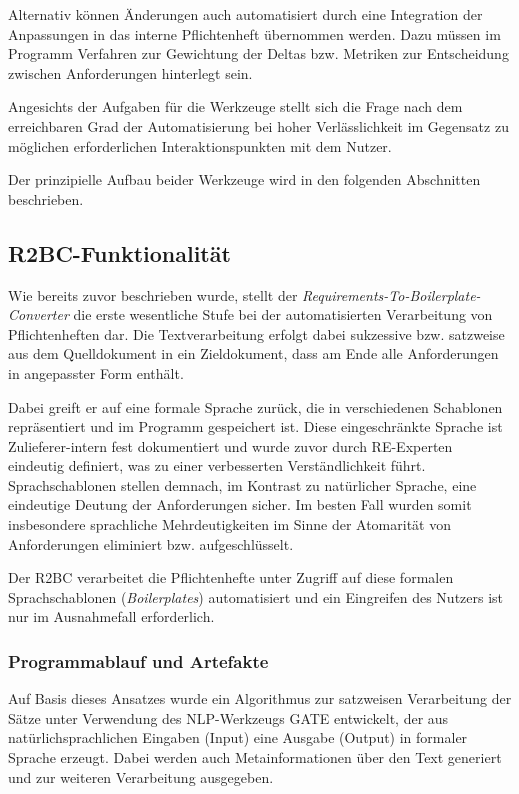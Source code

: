 \documentclass[12pt]{report}
\begin{document}
Alternativ können Änderungen auch automatisiert durch eine Integration der Anpassungen in das interne Pflichtenheft übernommen werden. Dazu müssen im Programm Verfahren zur Gewichtung der Deltas bzw. Metriken zur Entscheidung zwischen Anforderungen hinterlegt sein.

Angesichts der Aufgaben für die Werkzeuge stellt sich die Frage nach dem erreichbaren Grad der Automatisierung bei hoher Verlässlichkeit im Gegensatz zu möglichen erforderlichen Interaktionspunkten mit dem Nutzer. 

Der prinzipielle Aufbau beider Werkzeuge wird in den folgenden Abschnitten beschrieben.

\subsection{R2BC-Funktionalität}
Wie bereits zuvor beschrieben wurde, stellt der \textit{Requirements-To-Boilerplate-Converter} die erste wesentliche Stufe bei der automatisierten Verarbeitung von Pflichtenheften dar. Die Textverarbeitung erfolgt dabei sukzessive bzw. satzweise aus dem Quelldokument in ein Zieldokument, dass am Ende alle Anforderungen in angepasster Form enthält. 

Dabei greift er auf eine formale Sprache zurück, die in verschiedenen Schablonen repräsentiert und im Programm gespeichert ist. Diese eingeschränkte Sprache ist Zulieferer-intern fest dokumentiert und wurde zuvor durch RE-Experten eindeutig definiert, was zu einer verbesserten Verständlichkeit führt. Sprachschablonen stellen demnach, im Kontrast zu natürlicher Sprache, eine eindeutige Deutung der Anforderungen sicher. Im besten Fall wurden somit insbesondere sprachliche Mehrdeutigkeiten im Sinne der Atomarität von Anforderungen eliminiert bzw. aufgeschlüsselt.

Der R2BC verarbeitet die Pflichtenhefte unter Zugriff auf diese formalen Sprachschablonen (\textit{Boilerplates}) automatisiert und ein Eingreifen des Nutzers ist nur im Ausnahmefall erforderlich. 

\subsubsection{Programmablauf und Artefakte}
Auf Basis dieses Ansatzes wurde ein Algorithmus zur satzweisen Verarbeitung der Sätze unter Verwendung des NLP-Werkzeugs GATE entwickelt, der aus natürlichsprachlichen Eingaben (Input) eine Ausgabe (Output) in formaler Sprache erzeugt. Dabei werden auch Metainformationen über den Text generiert und zur weiteren Verarbeitung ausgegeben.
\end{document}
